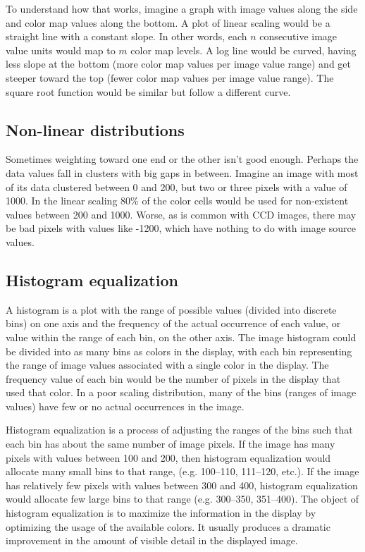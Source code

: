 To understand how that works, imagine a graph with image values along
the side and color map values along the bottom.  A plot of linear
scaling would be a straight line with a constant slope.  In other
words, each $n$ consecutive image value units would map to $m$
color map levels.  A log line would be curved, having less slope at
the bottom (more color map values per image value range) and get
steeper toward the top (fewer color map values per image value range).
The square root function would be similar but follow a different
curve.

\subsection{ Non-linear distributions }

Sometimes weighting toward one end or the other isn't good enough.
Perhaps the data values fall in clusters with big gaps in between.
Imagine an image with most of its data clustered between 0 and 200,
but two or three pixels with a value of 1000.  In the linear scaling
80\% of the color cells would be used for non-existent values between
200 and 1000.  Worse, as is common with CCD images, there may be bad
pixels with values like -1200, which have nothing to do with image
source values.

\subsection{ Histogram equalization }

A histogram is a plot with the range of possible values (divided into
discrete bins) on one axis and the frequency of the actual occurrence
of each value, or value within the range of each bin, on the other
axis.
The image histogram could be divided into as many bins as colors in
the display, with each bin representing the range of image values
associated with a single color in the display.  The frequency value
of each bin would be the number of pixels in the display that used
that color.  In a poor scaling distribution, many of the bins (ranges
of image values) have few or no actual occurrences in the image.

Histogram equalization is a process of adjusting the ranges of the
bins such that each bin has about the same number of image pixels.
If the image has many pixels with values between 100 and 200, then
histogram equalization would allocate many small bins to that range,
(e.g. 100--110, 111--120, etc.).  If the image has relatively few
pixels with values between 300 and 400, histogram equalization would
allocate few large bins to that range (e.g. 300--350, 351--400).  The
object of histogram equalization is to maximize the information in
the display by optimizing the usage of the available colors.  It
usually produces a dramatic improvement in the amount of visible
detail in the displayed image.

